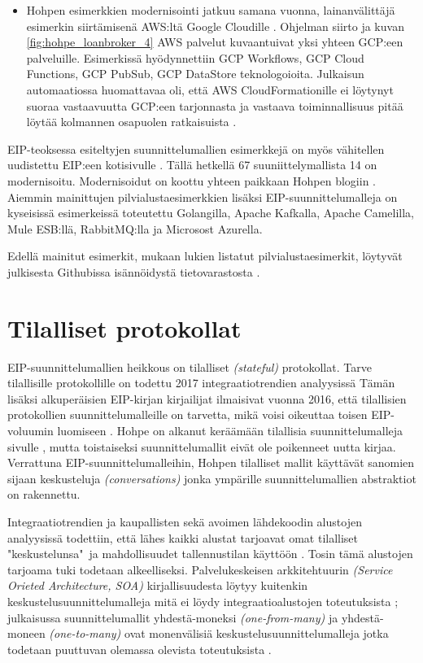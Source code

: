\begin{itemize}
   \item Hohpen esimerkkien modernisointi jatkuu samana vuonna, lainanvälittäjä esimerkin siirtämisenä AWS:ltä Google Cloudille \citep{HohpeLoanGCP}.
      Ohjelman siirto ja kuvan \ref{fig:hohpe_loanbroker_4} AWS palvelut kuvaantuivat yksi yhteen GCP:een palveluille. Esimerkissä hyödynnettiin GCP Workflows, GCP Cloud Functions, GCP PubSub, GCP DataStore teknologoioita.
      Julkaisun automaatiossa huomattavaa oli, että AWS CloudFormationille ei löytynyt suoraa vastaavuutta GCP:een tarjonnasta ja vastaava toiminnallisuus pitää löytää kolmannen osapuolen ratkaisuista \citep{HohpeLoanGCP}.
   \end{itemize}

   EIP-teoksessa esiteltyjen suunnittelumallien esimerkkejä on myös vähitellen uudistettu EIP:een kotisivulle \citep{conversationPatterns}. Tällä hetkellä 67 suuniittelymallista 14 on modernisoitu. Modernisoidut on koottu yhteen paikkaan Hohpen blogiin \citep{HohpeModernExamples}. Aiemmin mainittujen pilvialustaesimerkkien lisäksi EIP-suunnittelumalleja on kyseisissä esimerkeissä toteutettu Golangilla, Apache Kafkalla, Apache Camelilla, Mule ESB:llä, RabbitMQ:lla ja Microsost Azurella.
   
   Edellä mainitut esimerkit, mukaan lukien listatut pilvialustaesimerkit, löytyvät julkisesta Githubissa isännöidystä tietovarastosta \citep{EIPModernGit}.


\section{Tilalliset protokollat}
EIP-suunnittelumallien heikkous on tilalliset \textit{(stateful)} protokollat. Tarve tilallisille protokollille on todettu 2017 integraatiotrendien analyysissä \citep{Ritter2017} 
Tämän lisäksi alkuperäisien EIP-kirjan kirjailijat ilmaisivat vuonna 2016, että tilallisien protokollien suunnittelumalleille on tarvetta, mikä voisi oikeuttaa toisen EIP-voluumin luomiseen \citep{Zimmermann2016}.
Hohpe on alkanut keräämään tilallisia suunnittelumalleja sivulle \citep{conversationPatterns}, mutta toistaiseksi suunnittelumallit eivät ole poikenneet uutta kirjaa. Verrattuna EIP-suunnittelumalleihin, Hohpen tilalliset mallit käyttävät sanomien sijaan keskusteluja \textit{(conversations)} jonka ympärille suunnittelumallien abstraktiot on rakennettu.


Integraatiotrendien ja kaupallisten sekä avoimen lähdekoodin alustojen  analyysissä todettiin, että lähes kaikki alustat tarjoavat omat tilalliset "keskustelunsa"~ja mahdollisuudet tallennustilan käyttöön \citep{Ritter2017}. Tosin tämä alustojen tarjoama tuki todetaan alkeelliseksi. Palvelukeskeisen arkkitehtuurin \textit{(Service Orieted Architecture, SOA)} kirjallisuudesta löytyy kuitenkin keskustelusuunnittelumalleja mitä ei löydy integraatioalustojen toteutuksista \citep{Ritter2017};
julkaisussa \citep{Barros2005} suunnittelumallit yhdestä-moneksi \textit{(one-from-many)} ja yhdestä-moneen \textit{(one-to-many)} ovat monenvälisiä keskustelusuunnittelumalleja jotka todetaan puuttuvan olemassa olevista toteutuksista \citep{Ritter2017}.


